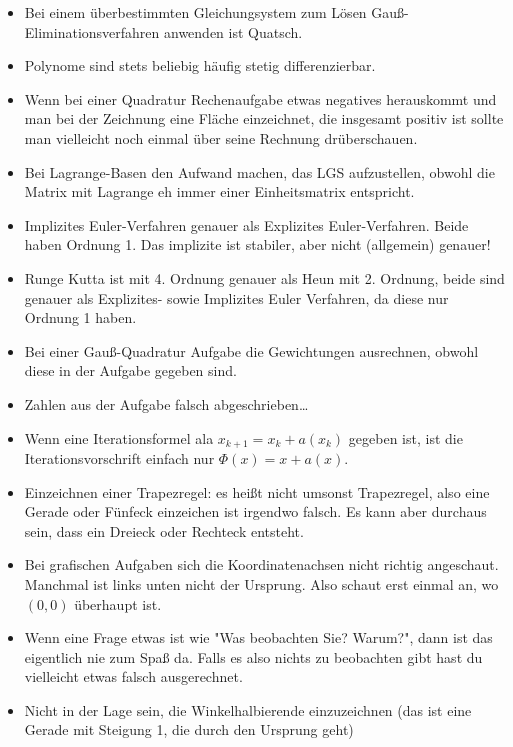 \begin{itemize}
	\item Bei einem überbestimmten Gleichungsystem zum Lösen Gauß-Eliminationsverfahren anwenden ist Quatsch.
	\item Polynome sind stets beliebig häufig stetig differenzierbar.
	\item Wenn bei einer Quadratur Rechenaufgabe etwas negatives herauskommt und man bei der Zeichnung eine Fläche einzeichnet, die insgesamt positiv ist sollte man vielleicht noch einmal über seine Rechnung drüberschauen.
	\item Bei Lagrange-Basen den Aufwand machen, das LGS aufzustellen, obwohl die Matrix mit Lagrange eh immer einer Einheitsmatrix entspricht.
	\item Implizites Euler-Verfahren  genauer als Explizites Euler-Verfahren. Beide haben Ordnung 1. Das implizite ist stabiler, aber nicht (allgemein) genauer!
	\item Runge Kutta ist mit 4. Ordnung genauer als Heun mit 2. Ordnung, beide sind genauer als Explizites- sowie Implizites Euler Verfahren, da diese nur Ordnung 1 haben.
	\item Bei einer Gauß-Quadratur Aufgabe die Gewichtungen ausrechnen, obwohl diese in der Aufgabe gegeben sind.
	\item Zahlen aus der Aufgabe falsch abgeschrieben\dots
	\item Wenn eine Iterationsformel ala $x_{k+1} = x_k + a(x_k)$ gegeben ist, ist die Iterationsvorschrift einfach nur $\Phi(x) = x + a(x)$.
	\item Einzeichnen einer Trapezregel: es heißt nicht umsonst Trapezregel, also eine Gerade oder Fünfeck einzeichen ist irgendwo falsch. Es kann aber durchaus sein, dass ein Dreieck oder Rechteck entsteht.
	\item Bei grafischen Aufgaben sich die Koordinatenachsen nicht richtig angeschaut. Manchmal ist links unten nicht der Ursprung. Also schaut erst einmal an, wo $(0,0)$ überhaupt ist.
	\item Wenn eine Frage etwas ist wie "Was beobachten Sie? Warum?", dann ist das eigentlich nie zum Spaß da. Falls es also nichts zu beobachten gibt hast du vielleicht etwas falsch ausgerechnet.
	\item Nicht in der Lage sein, die Winkelhalbierende einzuzeichnen (das ist eine Gerade mit Steigung 1, die durch den Ursprung geht)
\end{itemize}

